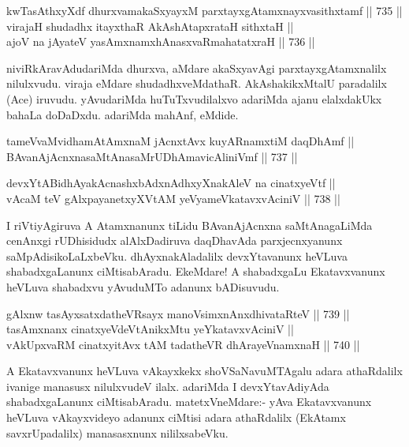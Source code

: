 \begin{shl}
kwTasAthxyXdf dhurxvamakaSxyayxM parxtayxgAtamxnayxvasithxtamf \hfill || 735 ||  \\
virajaH shudadhx itayxthaR AkAshAtapxrataH sithxtaH || \\
ajoV na jAyateV yasAmxnamxhAnasxvaRmahatatxraH \hfill || 736 ||  
\end{shl}

\begin{artha} 
niviRkAravAdudariMda dhurxva, aMdare akaSxyavAgi parxtayxgAtamxnalilx 
nilulxvudu. viraja eMdare shudadhxveMdathaR. AkAshakikxMtalU 
paradalilx (Ace) iruvudu. yAvudariMda huTuTxvudilalxvo adariMda ajanu 
elalxdakUkx bahaLa doDaDxdu. adariMda mahAnf, eMdide.
\end{artha}


\begin{shl}
tameVvaMvidhamAtAmxnaM jAcnxtAvx kuyARnamxtiM daqDhAmf || \\
BAvanAjAcnxnasaMtAnasaMrUDhAmavicAliniVmf \hfill || 737 ||  
\end{shl}
				
\begin{shl}
devxYtABidhAyakAcnashxbAdxnAdhxyXnakAleV na cinatxyeVtf || \\
vAcaM teV gAlxpayanetxyXVtAM yeVyameVkatavxvAciniV \hfill || 738 ||  
\end{shl}

\begin{artha} 
I riVtiyAgiruva A Atamxnanunx tiLidu BAvanAjAcnxna saMtAnagaLiMda 
cenAnxgi rUDhisidudx alAlxDadiruva daqDhavAda parxjecnxyanunx 
saMpAdisikoLaLxbeVku. dhAyxnakAladalilx devxYtavanunx heVLuva 
shabadxgaLanunx ciMtisabAradu. EkeMdare! A shabadxgaLu Ekatavxvanunx 
heVLuva shabadxvu yAvuduMTo adanunx bADisuvudu.
\end{artha}


\begin{shl}
gAlxnw tasAyxsatxdatheVR\s sayx manoV\s simxnAnxdhivataRteV \hfill || 739 || \\
tasAmxnanx cinatxyeVdeVtAnikxMtu yeYkatavxvAciniV || \\
vAkUpxvaRM cinatxyitAvx tAM tadatheVR dhArayeVnamxnaH \hfill || 740 ||  
\end{shl}

\begin{artha} 
A Ekatavxvanunx heVLuva vAkayxkekx shoVSaNavuMTAgalu adara athaRdalilx 
ivanige manasusx nilulxvudeV ilalx. adariMda I devxYtavAdiyAda 
shabadxgaLanunx ciMtisabAradu. matetxVneMdare:- yAva Ekatavxvanunx 
heVLuva vAkayxvideyo adanunx ciMtisi adara athaRdalilx (EkAtamx 
savxrUpadalilx) manasasxnunx nililxsabeVku.
\end{artha}

